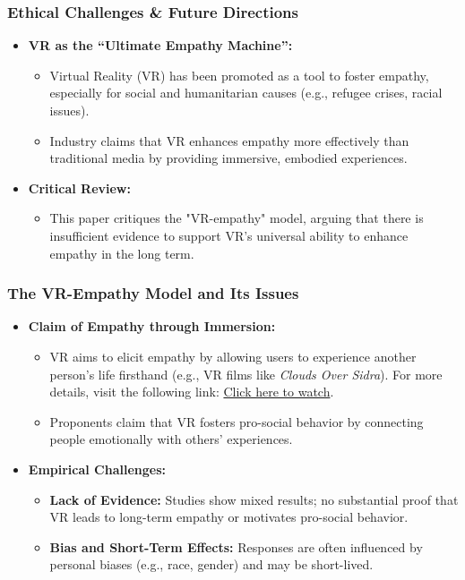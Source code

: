 \documentclass[aspectratio=169,xcolor=dvipsnames]{beamer}
\begin{document}
\begin{frame}
\frametitle{Ethical Challenges & Future Directions}
\begin{itemize}
    \item \textbf{VR as the “Ultimate Empathy Machine”:}
    \begin{itemize}
        \item Virtual Reality (VR) has been promoted as a tool to foster empathy, especially for social and humanitarian causes (e.g., refugee crises, racial issues).
        \item Industry claims that VR enhances empathy more effectively than traditional media by providing immersive, embodied experiences.
    \end{itemize}
    \item \textbf{Critical Review:}
    \begin{itemize}
        \item This paper critiques the "VR-empathy" model, arguing that there is insufficient evidence to support VR's universal ability to enhance empathy in the long term.
    \end{itemize}
\end{itemize}
\end{frame}

\begin{frame}
\frametitle{The VR-Empathy Model and Its Issues}
\begin{itemize}
    \item \textbf{Claim of Empathy through Immersion:}
    \begin{itemize}
          \item VR aims to elicit empathy by allowing users to experience another person’s life firsthand (e.g., VR films like \textit{Clouds Over Sidra}). For more details, visit the following link: \href{https://v.qq.com/x/page/d03194nt7hs.html}{Click here to watch}.

        \item Proponents claim that VR fosters pro-social behavior by connecting people emotionally with others' experiences.
    \end{itemize}
    \item \textbf{Empirical Challenges:}
    \begin{itemize}
        \item \textbf{Lack of Evidence:} Studies show mixed results; no substantial proof that VR leads to long-term empathy or motivates pro-social behavior.
        \item \textbf{Bias and Short-Term Effects:} Responses are often influenced by personal biases (e.g., race, gender) and may be short-lived.
    \end{itemize}
\end{itemize}
\end{frame}
\end{document}
